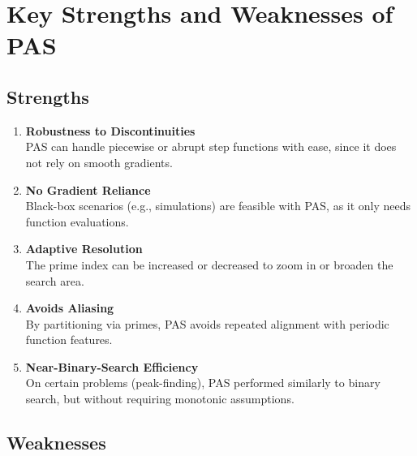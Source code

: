 \documentclass[10pt,twocolumn,letterpaper]{article}
\begin{document}
\section{Key Strengths and Weaknesses of PAS}

\subsection{Strengths}

\begin{enumerate}
    \item \textbf{Robustness to Discontinuities}\\
    PAS can handle piecewise or abrupt step functions with ease, since it does not rely on smooth gradients.
    
    \item \textbf{No Gradient Reliance}\\
    Black-box scenarios (e.g., simulations) are feasible with PAS, as it only needs function evaluations.
    
    \item \textbf{Adaptive Resolution}\\
    The prime index can be increased or decreased to zoom in or broaden the search area.
    
    \item \textbf{Avoids Aliasing}\\
    By partitioning via primes, PAS avoids repeated alignment with periodic function features.
    
    \item \textbf{Near-Binary-Search Efficiency}\\
    On certain problems (peak-finding), PAS performed similarly to binary search, but without requiring monotonic assumptions.
\end{enumerate}

\subsection{Weaknesses}
\end{document}
